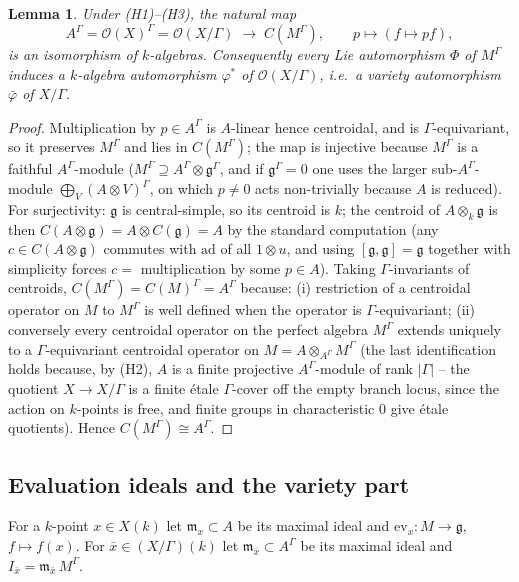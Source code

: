 \documentclass{amsart}
\newtheorem{lemma}{Lemma}
\theoremstyle{definition}
\newcommand{\g}{\mathfrak{g}}
\newcommand{\OO}{\mathcal{O}}
\newcommand{\M}{M}
\begin{document}
\begin{lemma}\label{lem:centroid}
Under \textnormal{(H1)--(H3)}, the natural map
\[
A^\Gamma=\OO(X)^\Gamma=\OO(X/\Gamma)\;\longrightarrow\;C(\M^\Gamma),
\qquad p\mapsto(f\mapsto pf),
\]
is an isomorphism of $k$-algebras.  Consequently every Lie automorphism
$\Phi$ of $\M^\Gamma$ induces a $k$-algebra automorphism $\varphi^*$ of
$\OO(X/\Gamma)$, i.e.\ a variety automorphism $\bar\varphi$ of $X/\Gamma$.
\end{lemma}
\begin{proof}
Multiplication by $p\in A^\Gamma$ is $A$-linear hence centroidal, and is
$\Gamma$-equivariant, so it preserves $\M^\Gamma$ and lies in
$C(\M^\Gamma)$; the map is injective because $\M^\Gamma$ is a faithful
$A^\Gamma$-module ($\M^\Gamma\supseteq A^\Gamma\otimes\g^\Gamma$, and if
$\g^\Gamma=0$ one uses the larger sub-$A^\Gamma$-module
$\bigoplus_V (A\otimes V)^\Gamma$, on which $p\ne0$ acts non-trivially
because $A$ is reduced).  For surjectivity: $\g$ is central-simple, so its
centroid is $k$; the centroid of $A\otimes_k\g$ is then
$C(A\otimes\g)=A\otimes C(\g)=A$ by the standard computation
(any $c\in C(A\otimes\g)$ commutes with $\mathrm{ad}$ of all $1\otimes u$,
and using $[\g,\g]=\g$ together with simplicity forces $c=$ multiplication
by some $p\in A$).  Taking $\Gamma$-invariants of centroids,
$C(\M^\Gamma)=C(\M)^\Gamma=A^\Gamma$ because: (i) restriction of a
centroidal operator on $\M$ to $\M^\Gamma$ is well defined when the
operator is $\Gamma$-equivariant; (ii) conversely every centroidal
operator on the perfect algebra $\M^\Gamma$ extends uniquely to a
$\Gamma$-equivariant centroidal operator on $\M=A\otimes_{A^\Gamma}\M^\Gamma$
(the last identification holds because, by (H2), $A$ is a finite
projective $A^\Gamma$-module of rank $|\Gamma|$ -- the quotient
$X\to X/\Gamma$ is a finite \'etale $\Gamma$-cover off the empty branch
locus, since the action on $k$-points is free, and finite groups in
characteristic $0$ give \'etale quotients).  Hence
$C(\M^\Gamma)\cong A^\Gamma$.
\end{proof}

\subsection{Evaluation ideals and the variety part}
For a $k$-point $x\in X(k)$ let $\mathfrak m_x\subset A$ be its maximal
ideal and $\mathrm{ev}_x\colon\M\to\g$, $f\mapsto f(x)$.  For
$\bar x\in (X/\Gamma)(k)$ let $\mathfrak m_{\bar x}\subset A^\Gamma$ be its
maximal ideal and $I_{\bar x}=\mathfrak m_{\bar x}\,\M^\Gamma$.
\end{document}
